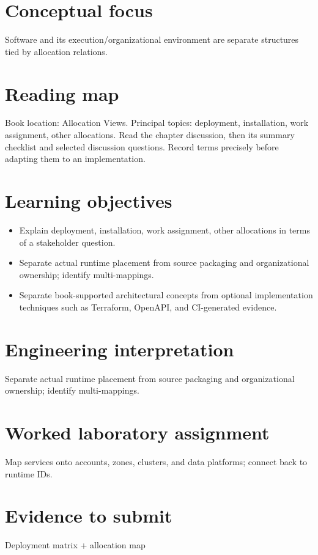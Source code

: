 \documentclass[10pt,letterpaper]{article}
\begin{document}
\DocProvenance
\section{Conceptual focus}
Software and its execution/organizational environment are separate structures tied by allocation relations.

\section{Reading map}
Book location: Allocation Views. Principal topics: deployment, installation, work assignment, other allocations. Read the chapter discussion, then its summary checklist and selected discussion questions. Record terms precisely before adapting them to an implementation.

\section{Learning objectives}
\begin{itemize}
\item Explain deployment, installation, work assignment, other allocations in terms of a stakeholder question.
\item Separate actual runtime placement from source packaging and organizational ownership; identify multi-mappings.
\item Separate book-supported architectural concepts from optional implementation techniques such as Terraform, OpenAPI, and CI-generated evidence.
\end{itemize}
\section{Engineering interpretation}
Separate actual runtime placement from source packaging and organizational ownership; identify multi-mappings.

\section{Worked laboratory assignment}
Map services onto accounts, zones, clusters, and data platforms; connect back to runtime IDs.

\section{Evidence to submit}
Deployment matrix + allocation map
\end{document}
